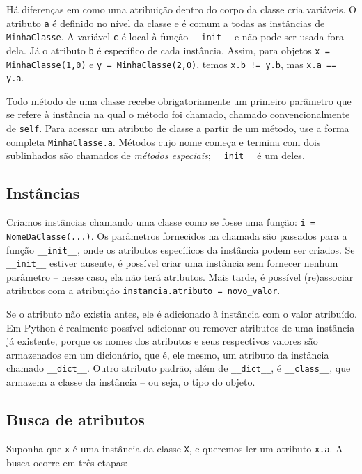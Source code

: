 \documentclass[11pt,a4paper]{article}
\begin{document}
Há diferenças em como uma atribuição dentro do corpo da classe cria
variáveis. O atributo \texttt{a} é definido no nível da classe e é comum
a todas as instâncias de \texttt{MinhaClasse}. A variável \texttt{c} é
local à função \texttt{\_\_init\_\_} e não pode ser usada fora dela. Já o
atributo \texttt{b} é específico de cada instância. Assim, para objetos
\texttt{x = MinhaClasse(1,0)} e \texttt{y = MinhaClasse(2,0)}, temos
\texttt{x.b != y.b}, mas \texttt{x.a == y.a}.

Todo método de uma classe recebe obrigatoriamente um primeiro parâmetro
que se refere à instância na qual o método foi chamado, chamado
convencionalmente de \texttt{self}. Para acessar um atributo de classe a
partir de um método, use a forma completa \texttt{MinhaClasse.a}. Métodos
cujo nome começa e termina com dois sublinhados são chamados de
\emph{métodos especiais}; \texttt{\_\_init\_\_} é um deles.

\subsection{Instâncias}

Criamos instâncias chamando uma classe como se fosse uma função:
\texttt{i = NomeDaClasse(...)}. Os parâmetros fornecidos na chamada são
passados para a função \texttt{\_\_init\_\_}, onde os atributos
específicos da instância podem ser criados. Se \texttt{\_\_init\_\_}
estiver ausente, é possível criar uma instância sem fornecer nenhum
parâmetro -- nesse caso, ela não terá atributos. Mais tarde, é possível
(re)associar atributos com a atribuição \texttt{instancia.atributo =
novo\_valor}.

Se o atributo não existia antes, ele é adicionado à instância com o valor
atribuído. Em Python é realmente possível adicionar ou remover atributos
de uma instância já existente, porque os nomes dos atributos e seus
respectivos valores são armazenados em um dicionário, que é, ele mesmo,
um atributo da instância chamado \texttt{\_\_dict\_\_}. Outro atributo
padrão, além de \texttt{\_\_dict\_\_}, é \texttt{\_\_class\_\_}, que
armazena a classe da instância -- ou seja, o tipo do objeto.

\subsection{Busca de atributos}

Suponha que \texttt{x} é uma instância da classe \texttt{X}, e queremos
ler um atributo \texttt{x.a}. A busca ocorre em três etapas:
\end{document}
